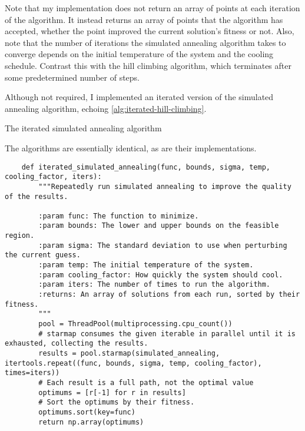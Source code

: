\documentclass{article}
\begin{document}
Note that my implementation does not return an array of points at each iteration of the algorithm.
It instead returns an array of points that the algorithm has accepted, whether the point improved
the current solution's fitness or not. Also, note that the number of iterations the simulated
annealing algorithm takes to converge depends on the initial temperature of the system and the
cooling schedule. Contrast this with the hill climbing algorithm, which terminates after some
predetermined number of steps.

Although not required, I implemented an iterated version of the simulated annealing algorithm,
echoing \autoref{alg:iterated-hill-climbing}.

\begin{algorithm}[H]
    \begin{algorithmic}
            \State{}
        \EndFunction{}
    \end{algorithmic}
    \caption{The iterated simulated annealing algorithm}\label{alg:iterated-simulated-annealing}
\end{algorithm}

The algorithms are essentially identical, as are their implementations.

\begin{verbatim}
    def iterated_simulated_annealing(func, bounds, sigma, temp, cooling_factor, iters):
        """Repeatedly run simulated annealing to improve the quality of the results.

        :param func: The function to minimize.
        :param bounds: The lower and upper bounds on the feasible region.
        :param sigma: The standard deviation to use when perturbing the current guess.
        :param temp: The initial temperature of the system.
        :param cooling_factor: How quickly the system should cool.
        :param iters: The number of times to run the algorithm.
        :returns: An array of solutions from each run, sorted by their fitness.
        """
        pool = ThreadPool(multiprocessing.cpu_count())
        # starmap consumes the given iterable in parallel until it is exhausted, collecting the results.
        results = pool.starmap(simulated_annealing, itertools.repeat((func, bounds, sigma, temp, cooling_factor), times=iters))
        # Each result is a full path, not the optimal value
        optimums = [r[-1] for r in results]
        # Sort the optimums by their fitness.
        optimums.sort(key=func)
        return np.array(optimums)
\end{verbatim}
\end{document}

